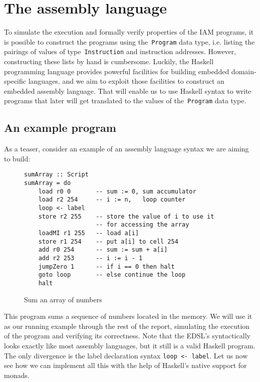 
\section{The assembly language}

To simulate the execution and formally verify properties of the IAM programs,
it is possible to construct the programs using the~\texttt{Program} data type, i.e.
listing the pairings of values of type~\texttt{Instruction} and instruction addresses.
However, constructing these lists by hand is cumbersome. Luckily, the Haskell programming
language provides powerful facilities for building embedded domain-specific languages, and
we aim to exploit those facilities to construct an embedded assembly language.
That will enable us to use Haskell syntax to write programs that later will get translated
to the values of the~\texttt{Program} data type.

\subsection{An example program}

As a teaser, consider an example of an assembly language syntax we are aiming to build:

\begin{figure}[H]
\begin{verbatim}
sumArray :: Script
sumArray = do
    load r0 0       -- sum := 0, sum accumulator
    load r2 254     -- i := n,   loop counter
    loop <- label
    store r2 255    -- store the value of i to use it
                    -- for accessing the array
    loadMI r1 255   -- load a[i]
    store r1 254    -- put a[i] to cell 254
    add r0 254      -- sum := sum + a[i]
    add r2 253      -- i := i - 1
    jumpZero 1      -- if i == 0 then halt
    goto loop       -- else continue the loop
    halt
\end{verbatim}
\caption{Sum an array of numbers}
\label{syntaxExample}
\end{figure}

This program sums a sequence of numbers located in the memory. We will use it as
our running example through the rest of the report, simulating the execution of the program
and verifying its correctness. Note that the EDSL's syntactically looks exactly like most
assembly languages, but it still is a valid Haskell program. The only
divergence is the label declaration syntax \texttt{loop <- label}.
Let us now see how we can implement all this with the help of Haskell's native
support for monads.

